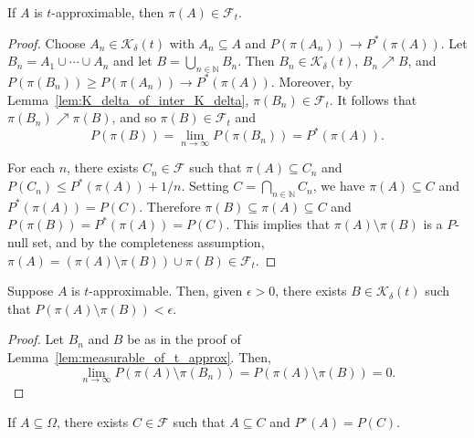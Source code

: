 \begin{lemma}\label{lem:measurable_of_t_approx}
  \leanok
  If $A$ is $t$-approximable, then $\pi(A) \in \mathcal{F}_t$.
\end{lemma}

\begin{proof}
  Choose $A_n \in \mathcal{K}_\delta(t)$ with $A_n \subseteq A$ and
  $P(\pi(A_n)) \to P^*(\pi(A))$. Let $B_n = A_1 \cup \cdots \cup A_n$ and
  let $B = \bigcup_{n \in \mathbb{N}} B_n$. Then
  $B_n \in \mathcal{K}_\delta(t)$, $B_n \nearrow B$, and $P(\pi(B_n)) \geq P(\pi(A_n)) \to
  P^*(\pi(A))$.
  Moreover, by Lemma~\ref{lem:K_delta_of_inter_K_delta}, $\pi(B_n) \in \mathcal{F}_t$.
  It follows that $\pi(B_n) \nearrow \pi(B)$, and so $\pi(B) \in \mathcal{F}_t$ and
  $$P(\pi(B)) = \lim_{n \to \infty} P(\pi(B_n)) = P^*(\pi(A)).$$

  For each $n$, there exists $C_n \in \mathcal{F}$ such that
  $\pi(A) \subseteq C_n$ and $P(C_n) \leq P^*(\pi(A)) + 1/n$. Setting
  $C = \bigcap_{n \in \mathbb{N}} C_n$, we have $\pi(A) \subseteq C$ and $P^*(\pi(A)) = P(C)$.
  Therefore
  $\pi(B) \subseteq \pi(A) \subseteq C$ and $P(\pi(B)) = P^*(\pi(A)) = P(C)$.
  This implies that $\pi(A) \setminus \pi(B)$ is a $P$-null set, and by
  the completeness assumption, $\pi(A) = (\pi(A) \setminus \pi(B)) \cup \pi(B) \in \mathcal{F}_t$.
\end{proof}

\begin{lemma}\label{lem:exists_B_of_t_approx}
  \leanok
  Suppose $A$ is $t$-approximable. Then, given $\epsilon > 0$, there exists
  $B \in \mathcal{K}_\delta (t)$ such that $P(\pi(A) \setminus \pi(B)) < \epsilon$.
\end{lemma}

\begin{proof}
  Let $B_n$ and $B$ be as in the proof of Lemma~\ref{lem:measurable_of_t_approx}.
  Then,
  $$\lim_{n \to \infty} P(\pi(A) \setminus \pi(B_n)) = P(\pi(A) \setminus \pi(B)) = 0.$$
\end{proof}

\begin{lemma}\label{lem:aux1a}
  \leanok
If $A \subseteq \Omega$, there exists $C \in \mathcal{F}$ such that $A \subseteq C$ and $P^∗(A) = P(C)$.
\end{lemma}

